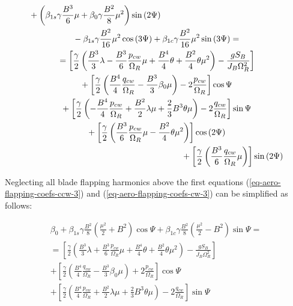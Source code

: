\begin{gather}
\begin{multlined}[0.88\textwidth]
    +
    \left(
        \beta_{1s} \gamma \frac{B^3}{6} \mu
      + \beta_0 \gamma \frac{B^2}{8} \mu^2
    \right) \sin \left( 2 \Psi \right)
    \\
    -
    \beta_{1s} \gamma \frac{B^2}{16} \mu^2 \cos \left( 3 \Psi \right)
    +
    \beta_{1c} \gamma \frac{B^2}{16} \mu^2 \sin \left( 3 \Psi \right)
    = \\ =
    \left[
      \frac{\gamma}{2}
      \left(
          \frac{B^3}{3} \lambda
        - \frac{B^3}{6} \frac{p_{cw}}{\Omega_R} \mu
        + \frac{B^4}{4} \theta
        + \frac{B^2}{4} \theta \mu^2
      \right) - \frac{ g S_B }{ J_B \Omega_R^2 }
    \right]
    \\
    + \left[
      \frac{\gamma}{2}
      \left(
          \frac{B^4}{4} \frac{q_{cw}}{\Omega_R}
        - \frac{B^3}{3} \beta_0 \mu
      \right) - 2 \frac{p_{cw}}{\Omega_R}
    \right] \cos \Psi
    \\
    + \left[
      \frac{\gamma}{2}
      \left(
        - \frac{B^4}{4} \frac{p_{cw}}{\Omega_R}
        + \frac{B^2}{2} \lambda \mu
        + \frac{2}{3} B^3 \theta \mu
        \right) - 2 \frac{q_{cw}}{\Omega_R}
    \right] \sin \Psi
    \\
    + \left[
      \frac{\gamma}{2}
      \left(
          \frac{B^3}{6} \frac{p_{cw}}{\Omega_R} \mu
        - \frac{B^2}{4} \theta \mu^2
      \right)
    \right] \cos \left( 2 \Psi \right)
    \\
    + \left[
      \frac{\gamma}{2}
      \left( \frac{B^3}{6} \frac{q_{cw}}{\Omega_R} \mu \right)
    \right] \sin \left( 2 \Psi \right)
  \end{multlined}
\end{gather}

Neglecting all blade flapping harmonics above the first \cite{GessowMyers1985} equations (\ref{eq-aero-flapping-coefs-ccw-3}) and (\ref{eq-aero-flapping-coefs-cw-3}) can be simplified as follows:

\begin{multline}
  \label{eq-aero-flapping-coefs-ccw-4}
  \beta_0
  +
  \beta_{1s} \gamma \frac{B^2}{8}
  \left( \frac{\mu^2}{2} + B^2 \right) \cos \Psi
  +
  \beta_{1c} \gamma \frac{B^2}{8}
  \left( \frac{\mu^2}{2} - B^2 \right) \sin \Psi
  = \\ =
  \left[
    \frac{\gamma}{2}
    \left(
        \frac{B^3}{3} \lambda
      + \frac{B^3}{6} \frac{p_{cw}}{\Omega_R} \mu
      + \frac{B^4}{4} \theta
      + \frac{B^2}{4} \theta \mu^2
    \right) - \frac{ g S_B }{ J_B \Omega_R^2 }
  \right]
  \\
  + \left[
    \frac{\gamma}{2}
    \left(
      \frac{B^4}{4} \frac{q_{cw}}{\Omega_R}
      - \frac{B^3}{3} \beta_0 \mu
    \right) + 2 \frac{p_{cw}}{\Omega_R}
  \right] \cos \Psi
  \\
  + \left[
    \frac{\gamma}{2}
    \left(
        \frac{B^4}{4} \frac{p_{cw}}{\Omega_R}
      + \frac{B^2}{2} \lambda \mu
      + \frac{2}{3} B^3 \theta \mu
    \right) - 2 \frac{q_{cw}}{\Omega_R}
  \right] \sin \Psi
\end{multline}

